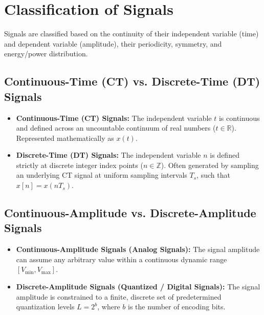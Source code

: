 \documentclass[12pt,a4paper]{article}
\begin{document}
\section{Classification of Signals}

Signals are classified based on the continuity of their independent variable (time) and dependent variable (amplitude), their periodicity, symmetry, and energy/power distribution.

\subsection{Continuous-Time (CT) vs. Discrete-Time (DT) Signals}
\begin{itemize}[leftmargin=*, itemsep=3pt]
  \item \textbf{Continuous-Time (CT) Signals:} The independent variable $t$ is continuous and defined across an uncountable continuum of real numbers ($t \in \mathbb{R}$). Represented mathematically as $x(t)$.
  \item \textbf{Discrete-Time (DT) Signals:} The independent variable $n$ is defined strictly at discrete integer index points ($n \in \mathbb{Z}$). Often generated by sampling an underlying CT signal at uniform sampling intervals $T_s$, such that $x[n] = x(n T_s)$.
\end{itemize}

\subsection{Continuous-Amplitude vs. Discrete-Amplitude Signals}
\begin{itemize}[leftmargin=*, itemsep=3pt]
  \item \textbf{Continuous-Amplitude Signals (Analog Signals):} The signal amplitude can assume any arbitrary value within a continuous dynamic range $[V_{\min}, V_{\max}]$.
  \item \textbf{Discrete-Amplitude Signals (Quantized / Digital Signals):} The signal amplitude is constrained to a finite, discrete set of predetermined quantization levels $L = 2^b$, where $b$ is the number of encoding bits.
\end{itemize}
\end{document}

